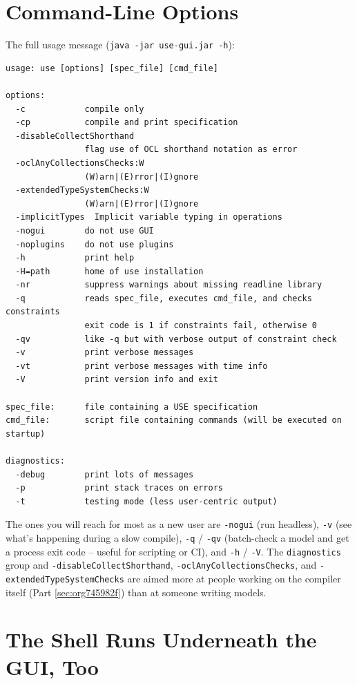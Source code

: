 \documentclass[11pt,twoside,a4paper]{book}
\begin{document}
\section{Command-Line Options}
\label{sec:org1be0851}

The full usage message (\texttt{java -jar use-gui.jar -h}):

\begin{verbatim}
usage: use [options] [spec_file] [cmd_file]

options:
  -c            compile only
  -cp           compile and print specification
  -disableCollectShorthand
                flag use of OCL shorthand notation as error
  -oclAnyCollectionsChecks:W
                (W)arn|(E)rror|(I)gnore
  -extendedTypeSystemChecks:W
                (W)arn|(E)rror|(I)gnore
  -implicitTypes  Implicit variable typing in operations
  -nogui        do not use GUI
  -noplugins    do not use plugins
  -h            print help
  -H=path       home of use installation
  -nr           suppress warnings about missing readline library
  -q            reads spec_file, executes cmd_file, and checks constraints
                exit code is 1 if constraints fail, otherwise 0
  -qv           like -q but with verbose output of constraint check
  -v            print verbose messages
  -vt           print verbose messages with time info
  -V            print version info and exit

spec_file:      file containing a USE specification
cmd_file:       script file containing commands (will be executed on startup)

diagnostics:
  -debug        print lots of messages
  -p            print stack traces on errors
  -t            testing mode (less user-centric output)
\end{verbatim}

The ones you will reach for most as a new user are \texttt{-nogui} (run
headless), \texttt{-v} (see what's happening during a slow compile), \texttt{-q} /
\texttt{-qv} (batch-check a model and get a process exit code -- useful for
scripting or CI), and \texttt{-h} / \texttt{-V}. The \texttt{diagnostics} group and
\texttt{-disableCollectShorthand}, \texttt{-oclAnyCollectionsChecks}, and
\texttt{-extendedTypeSystemChecks} are aimed more at people working on the
compiler itself (Part \ref{sec:org745982f}) than at someone writing
models.

\section{The Shell Runs Underneath the GUI, Too}
\label{sec:org7afd954}
\end{document}
